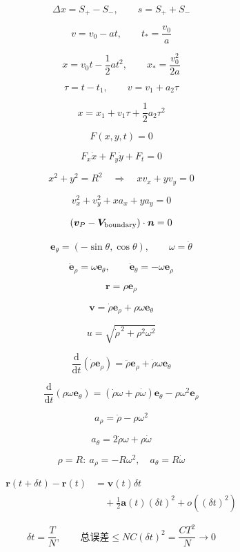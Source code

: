 \documentclass[12pt]{article}
\begin{document}
\[
\boxed{\Delta x=S_+-S_-},\qquad\boxed{s=S_++S_-}
\]

\[
v=v_0-at,\qquad t_*=\frac{v_0}{a}
\]

\[
x=v_0t-\frac12at^2,\qquad x_*=\frac{v_0^2}{2a}
\]

\[
\tau=t-t_1,\qquad v=v_1+a_2\tau
\]

\[
x=x_1+v_1\tau+\frac12a_2\tau^2
\]

\[
F(x,y,t)=0
\]

\[
F_x\dot x+F_y\dot y+F_t=0
\]

\[
x^2+y^2=R^2\quad\Longrightarrow\quad xv_x+yv_y=0
\]

\[
v_x^2+v_y^2+xa_x+ya_y=0
\]

\[
(\boldsymbol v_P-\boldsymbol V_{\rm boundary})\cdot\boldsymbol n=0
\]

\[
\boldsymbol e_\theta=(-\sin\theta,\cos\theta),\qquad\omega=\dot\theta
\]

\[
\dot{\boldsymbol e}_\rho=\omega\boldsymbol e_\theta,\qquad \dot{\boldsymbol e}_\theta=-\omega\boldsymbol e_\rho
\]

\[
\boldsymbol r=\rho\boldsymbol e_\rho
\]

\[
\boxed{\boldsymbol v=\dot\rho\boldsymbol e_\rho+\rho\omega\boldsymbol e_\theta}
\]

\[
u=\sqrt{\dot\rho^{\,2}+\rho^2\omega^2}
\]

\[
\frac{\mathrm d}{\mathrm dt}(\dot\rho\boldsymbol e_\rho) =\ddot\rho\boldsymbol e_\rho+\dot\rho\omega\boldsymbol e_\theta
\]

\[
\frac{\mathrm d}{\mathrm dt}(\rho\omega\boldsymbol e_\theta) =(\dot\rho\omega+\rho\dot\omega)\boldsymbol e_\theta-\rho\omega^2\boldsymbol e_\rho
\]

\[
\boxed{a_\rho=\ddot\rho-\rho\omega^2}
\]

\[
\boxed{a_\theta=2\dot\rho\omega+\rho\dot\omega}
\]

\[
\rho=R:\ a_\rho=-R\omega^2,\quad a_\theta=R\dot\omega
\]

\[
\begin{aligned} \boldsymbol r(t+\delta t)-\boldsymbol r(t) &=\boldsymbol v(t)\delta t\\ &\quad+\tfrac12\boldsymbol a(t)(\delta t)^2+o((\delta t)^2) \end{aligned}
\]

\[
\delta t=\frac TN,\qquad \text{总误差}\le NC(\delta t)^2=\frac{CT^2}{N}\to0
\]
\end{document}
